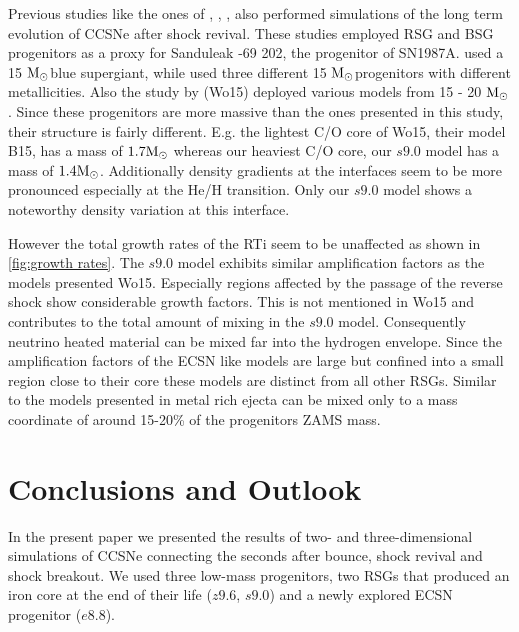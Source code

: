 \documentclass[fleqn,usenatbib]{mnras}
\newcommand{\solm}{\xspace\ensuremath{\rm{M_{\odot}}}}
\begin{document}
Previous studies like the ones of \cite{Hammer2010}, \cite{Joggerst2010}, \citet{Wongwathanarat2015}, \citet{Kifonidis2005} also performed simulations of the long term evolution of CCSNe after shock revival. These studies employed RSG and BSG progenitors as a proxy for Sanduleak -69 202, the progenitor of SN1987A. \citet{Hammer2010} used a 15 \solm blue supergiant, while \citet{Joggerst2010} used three different 15 \solm progenitors with different metallicities. Also the study by
\citet{Wongwathanarat2015} (Wo15) deployed various models from 15 - 20 \solm. 
Since these progenitors are more massive than the ones presented in this study, their structure is fairly different. E.g. the lightest C/O core of Wo15, their model B15, has a mass of $1.7\solm$ whereas our heaviest C/O core, our $s9.0$ model has a mass of $1.4\solm$. Additionally density gradients at the interfaces seem to be more pronounced especially at the He/H transition. Only our $s9.0$ model shows a noteworthy density variation at this interface.

However the total growth rates of the RTi seem to be unaffected as shown in \autoref{fig:growth rates}. The $s9.0$ model exhibits similar amplification factors as the models presented Wo15. Especially regions affected by the passage of the reverse shock show considerable growth factors. This is not mentioned in Wo15 and contributes to the total amount of mixing in the $s9.0$ model. Consequently neutrino heated material can be mixed far into the hydrogen envelope. 
Since the amplification factors of the ECSN like models are large but confined into a small region close to their core these models are distinct from all other RSGs. Similar to the models presented in \citet{Joggerst2010} metal rich ejecta can be mixed only to a mass coordinate of around 15-20\% of the progenitors ZAMS mass.

\section{Conclusions and Outlook}
In the present paper we presented the results of two- and three-dimensional simulations of CCSNe connecting the seconds after bounce, shock revival and shock breakout. We used three low-mass progenitors, two RSGs that produced an iron core at the end of their life ($z9.6$, $s9.0$) and a newly explored ECSN progenitor ($e8.8$). 
\end{document}

